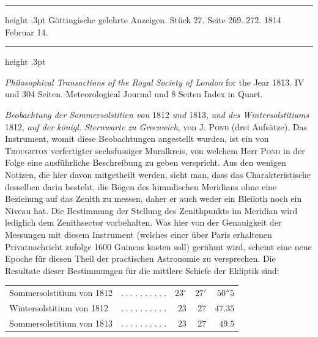 \par\bigskip

\hypertarget{native-566-lower}{}
\begin{center}
\parbox{.81\linewidth}{%
\centering\small
\hrule height .3pt\relax\vspace{2.5pt}
Göttingische gelehrte Anzeigen. Stück 27. Seite 269..272. 1814 Februar 14.\par
\vspace{2.5pt}\hrule height .3pt\relax
}
\end{center}

\emph{Philosophical Transactions of the Royal Society of London} for the Jear 1813. 
IV und 304 Seiten. Meteorological Journal und 8 Seiten Index in Quart.

\emph{Beobachtung der Sommersolstitien von} 1812 \emph{und} 1813, \emph{und des Wintersolstitiums} 1812, \emph{auf der königl. Sternwarte zu Greenwich}, von J. \textsc{Pond} (drei Aufsätze). Das Instrument, womit diese Beobachtungen angestellt wurden, ist ein von \textsc{Troughton} verfertigter sechsfussiger Muralkreis, von welchem Herr \textsc{Pond} in der Folge eine ausführliche Beschreibung zu geben verspricht. Aus den wenigen Notizen, die hier davon mitgetheilt werden, sieht man, dass das Charakteristische desselben darin besteht, die Bögen des himmlischen Meridians ohne eine Beziehung auf das Zenith zu messen, daher er auch weder ein Bleiloth noch ein Niveau hat. Die Bestimmung der Stellung des Zenithpunkts im Meridian wird lediglich dem Zenithsector vorbehalten. Was hier von der Genauigkeit der Messungen mit diesem Instrument (welches einer über Paris erhaltenen Privatnachricht zufolge 1600 Guineas kosten soll) gerühmt wird, scheint eine neue Epoche für diesen Theil der practischen Astronomie zu versprechen. Die Resultate dieser Bestimmungen für die mittlere Schiefe der Ekliptik sind:

\begin{center}\fontsize{9}{11}\selectfont\setlength{\tabcolsep}{3pt}\renewcommand{\arraystretch}{1.18}\begin{tabular}{@{}l c r@{\;}r@{\;}r@{}}
Sommersolstitium von 1812 & $.\;.\;.\;.\;.\;.\;.\;.\;.\;.$ & $23^\circ$ & $27'$ & $50''5$\\
Wintersolstitium von 1812 & $.\;.\;.\;.\;.\;.\;.\;.\;.\;.$ & $23$ & $27$ & $47.35$\\
Sommersolstitium von 1813 & $.\;.\;.\;.\;.\;.\;.\;.\;.\;.$ & $23$ & $27$ & $49.5$\\
\end{tabular}\end{center}

